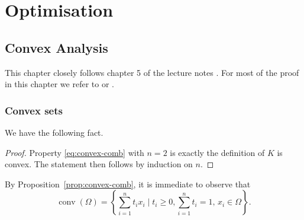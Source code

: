 \documentclass{report}
\begin{document}
	
	\thispagestyle{empty}
	\newpage%
	\tableofcontents
	
	\part{Optimisation}
	\chapter{Convex Analysis}

	This chapter closely follows chapter 5 of the lecture notes \cite{fornasierFoundations}.
	For most of the proof in this chapter we refer to \cite{boydConvex2023} or \cite{rockafellarConvex2015}.

	\section{Convex sets}


	We have the following fact.


	 \begin{proof}
		Property \eqref{eq:convex-comb} with $n=2$ is exactly the definition of $K$ is convex. The statement then follows by induction on $n$. 
	 \end{proof}


	By Proposition~\ref{prop:convex-comb}, it is immediate to observe that 
	\begin{equation}
		\operatorname{conv}(\Omega) = \left\{ \sum_{i=1}^n t_i x_i \mid t_i\ge 0, \sum_{i=1}^n t_i = 1,\, x_i \in \Omega \right\}.
	\end{equation}
\end{document}
